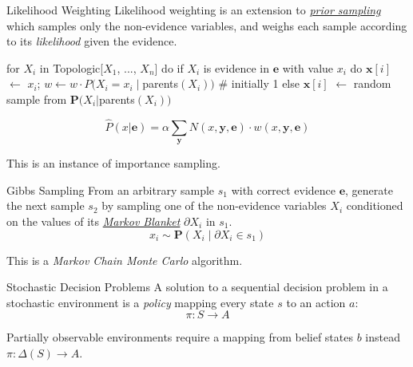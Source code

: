 \documentclass{cognito}
\begin{document}
\begin{note}{Likelihood Weighting}
	Likelihood weighting is an extension to  \hyperref[note:Direct Sampling]{\it prior sampling} which
	samples only the non-evidence variables, and weighs each sample according to
	its \emph{likelihood} given the evidence.
	\begin{code}
for $X_i$ in Topologic[$X_1$, ..., $X_n$] do
	if $X_i$ is evidence in $\mathbf{e}$ with value $x_i$ do
		$\mathbf{x}[i]$ $\leftarrow$ $x_i$; $w \leftarrow w \cdot P(X_i = x_i \mid $parents$(X_i))$  # initially 1
	else $\mathbf{x}[i]$ $\leftarrow$ random sample from $\mathbf{P}(X_i | $parents$(X_i) )$
	\end{code}
	$$
		\textstyle \hat{P}(x | \mathbf{e}) = \alpha \sum_\mathbf{y} N(x, \mathbf{y}, \mathbf{e}) \cdot w(x, \mathbf{y}, \mathbf{e})
	$$
	\begin{remark} This is an instance of importance sampling.\end{remark}
	\vspace{-5pt}
\end{note}

\begin{note}{Gibbs Sampling}
	From an arbitrary sample $s_1$ with correct evidence $\mathbf{e}$, generate the next sample $s_2$ by sampling
	one of the non-evidence variables $X_i$
	conditioned on the values of its \hyperref[note:Markov Blanket]{\emph{Markov Blanket}} $\partial X_i$ in $s_1$.
	$$ x_i \sim \mathbf{P}(X_i \mid \partial X_i \in s_1)$$
	\begin{remark} This is a \emph{Markov Chain Monte Carlo} algorithm.
	\end{remark}
	\vspace{-5pt}
\end{note}





\begin{note}{Stochastic Decision Problems}
	A solution to a sequential decision problem in a stochastic environment
	is a \emph{policy} mapping
	every state $s$ to an action $a$:
	$$
		\pi : S \to A
	$$
	\begin{remark} Partially observable environments require a mapping from belief states $b$ instead $\pi : \Delta(S) \to A$.
	\end{remark}
	\vspace{-5pt}
\end{note}
\end{document}
